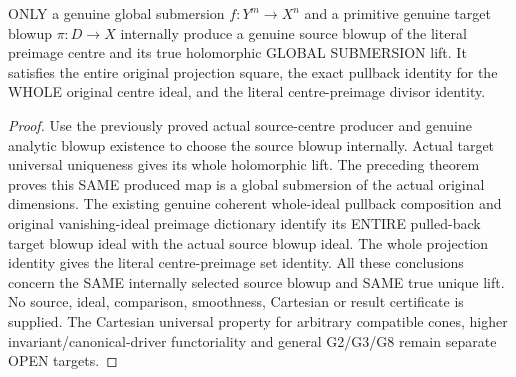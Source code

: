 \begin{theorem}
\label{hir:submersion-blowup-choice-original-output}
\leanok
{}
ONLY a genuine global submersion $f:Y^m\to X^n$ and a primitive genuine target
blowup $\pi:D\to X$ internally produce a genuine source blowup of the literal
preimage centre and its true holomorphic GLOBAL SUBMERSION lift. It satisfies
the entire original projection square, the exact pullback identity for the
WHOLE original centre ideal, and the literal centre-preimage divisor identity.
\end{theorem}
\begin{proof}
Use the previously proved actual source-centre producer and genuine analytic
blowup existence to choose the source blowup internally. Actual target
universal uniqueness gives its whole holomorphic lift. The preceding theorem
proves this SAME produced map is a global submersion of the actual original
dimensions. The existing genuine coherent whole-ideal pullback composition
and original vanishing-ideal preimage dictionary identify its ENTIRE
pulled-back target blowup ideal with the actual source blowup ideal.
The whole projection identity gives the literal centre-preimage set identity.
All these conclusions concern the SAME internally selected source blowup
and SAME true unique lift. No source, ideal, comparison, smoothness, Cartesian
or result certificate is supplied. The Cartesian universal property for
arbitrary compatible cones, higher invariant/canonical-driver functoriality
and general G2/G3/G8 remain separate OPEN targets.
\end{proof}
